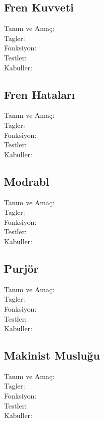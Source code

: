 \documentclass[10pt,a4paper]{article}
\begin{document}
\subsection{Fren Kuvveti}
\begin{description}
\item[Tanım ve Amaç:] 
\item[Tagler:]
\item[Fonksiyon:]
\item[Testler:]
\item[Kabuller:]
\end{description}
\newpage

\subsection{Fren Hataları}
\begin{description}
\item[Tanım ve Amaç:] 
\item[Tagler:]
\item[Fonksiyon:]
\item[Testler:]
\item[Kabuller:]
\end{description}
\newpage

\subsection{Modrabl}
\begin{description}
\item[Tanım ve Amaç:] 
\item[Tagler:]
\item[Fonksiyon:]
\item[Testler:]
\item[Kabuller:]
\end{description}
\newpage

\subsection{Purjör}
\begin{description}
\item[Tanım ve Amaç:] 
\item[Tagler:]
\item[Fonksiyon:]
\item[Testler:]
\item[Kabuller:]
\end{description}
\newpage

\subsection{Makinist Musluğu}
\begin{description}
\item[Tanım ve Amaç:] 
\item[Tagler:]
\item[Fonksiyon:]
\item[Testler:]
\item[Kabuller:]
\end{description}
\newpage
\end{document}
